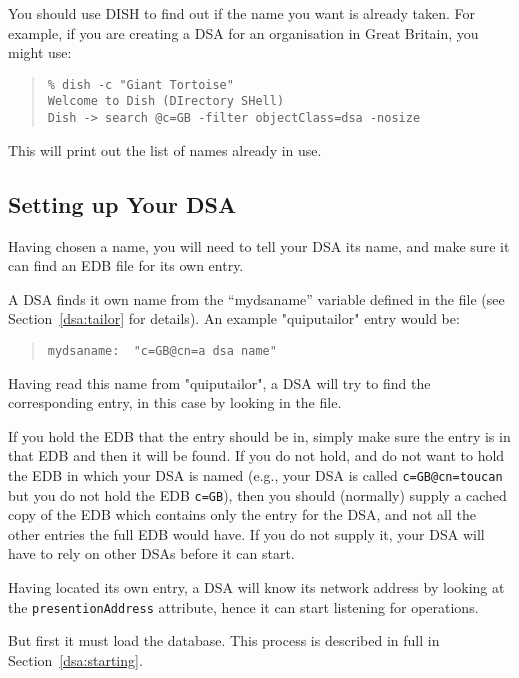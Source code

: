 
You should use DISH to find out if the name you want is already taken.
For example,
if you are creating a DSA for an organisation in Great Britain,
you might use:
\begin{quote}\small\begin{verbatim}
% dish -c "Giant Tortoise"
Welcome to Dish (DIrectory SHell)
Dish -> search @c=GB -filter objectClass=dsa -nosize
\end{verbatim}\end{quote}
This will print out the list of names already in use.

\subsection{Setting up Your DSA}

Having chosen a name, you will need to tell your DSA its name, and 
make sure it can find an EDB file for its own entry.

A DSA finds it own name from the ``mydsaname'' variable defined in the file
 (see Section~\ref{dsa:tailor} for details).
An example \file"quiputailor" entry would be:
\begin{quote}\small\begin{verbatim}
mydsaname:	"c=GB@cn=a dsa name"
\end{verbatim}\end{quote}
Having read this name from \file"quiputailor", a DSA will try to find
the corresponding entry, in this case by looking in the  file.

If you hold the EDB that the entry should be in, simply
make sure the entry is in that EDB and then it will be found.
If you do not hold, and do not want to hold the EDB in which your
DSA is named (e.g., your DSA is called \verb"c=GB@cn=toucan" but 
you do not hold the EDB \verb"c=GB"), then you should (normally)
supply a cached copy of the EDB which contains only the 
entry for the DSA, and not all the other entries the full EDB would have.
If you do not supply it, your DSA will have to rely on other DSAs before it
can start.

Having located its own entry, a DSA will know its network 
address by looking at the \verb+presentionAddress+ attribute,
hence it can start listening for operations.

But first it must load the database. This process is described in full
in Section~\ref{dsa:starting}. 

